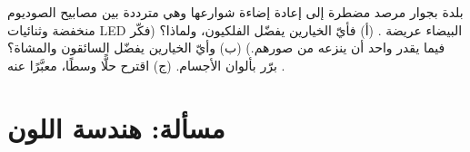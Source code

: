 \begin{exercise}[$\star\star\star$]\label{exo:g11:color-light-sources:15}
بلدة بجوار مرصد مضطرة إلى إعادة إضاءة شوارعها وهي مترددة
بين مصابيح الصوديوم منخفضة  وثنائيات LED البيضاء عريضة .
(أ) فأيّ الخيارين يفضّل الفلكيون، ولماذا؟ (فكّر فيما يقدر
 واحد أن ينزعه من صورهم.) (ب) وأيّ الخيارين يفضّل
السائقون والمشاة؟ برّر بألوان الأجسام.
(ج) اقترح حلًّا وسطًا، معبَّرًا عنه .
\end{exercise}

\section{مسألة: هندسة اللون}

